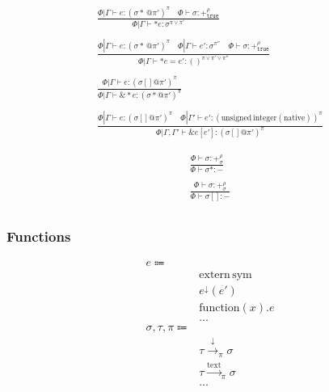 \documentclass {article}
\begin{document}
\begin{gather*}
\frac
{\Phi | \Gamma \vdash e : (\sigma* \, @ \pi')^\pi \quad \Phi \vdash \sigma : +^\rho_\texttt{true}}
{\Phi | \Gamma \vdash * e  : \sigma^{\pi \lor \pi'}} \\
\\
\frac
{\Phi | \Gamma \vdash e : (\sigma* \, @ \pi')^\pi \quad \Phi | \Gamma \vdash e' : \sigma^{\pi''}  \quad \Phi \vdash \sigma : +^\rho_\texttt{true}}
{\Phi | \Gamma \vdash *e  = e' : ()^{\pi \lor \pi' \lor \pi''} } \\
\\
\frac
{\Phi | \Gamma \vdash e : (\sigma[] @ \pi') ^ \pi}
{\Phi | \Gamma \vdash \& * e : (\sigma * @ \pi') ^ \pi}\\
\\
\frac
{\Phi | \Gamma \vdash e : (\sigma [] @ \pi')^\pi \quad \Phi |
 \Gamma' \vdash e' : (\text{unsigned} \, \text{integer}(\text{native}))^\pi}
{\Phi | \Gamma, \Gamma' \vdash \&e [e'] : (\sigma [] @  \pi')^\pi}
\end{gather*}

\begin{gather*}
\frac
{\Phi \vdash \sigma : +^{\rho}_\sigma}
{\Phi \vdash \sigma* : -} \\
\\
\frac
{\Phi \vdash \sigma : +^{\rho}_\sigma}
{\Phi \vdash \sigma [] : -} \\
\end{gather*}

\subsubsection{Functions}

\begin{align*}
e \Coloneqq & \\
& \text{extern} \, \text{sym} \tag{Extern Function} \\
& e ^\downarrow (e') \tag{Function Pointer Application} \\
& \text{function} (x). e \tag{Function Literal} \\
& \dots \\
\sigma, \tau, \pi \Coloneqq & \\
& \tau \xrightarrow{\downarrow}_\pi \sigma \tag{Function Pointer}\\
& \tau \xrightarrow{\text{text}}_\pi \sigma  \tag{Function Literal Type} \\
& \dots
\end{align*}
\end{document}
